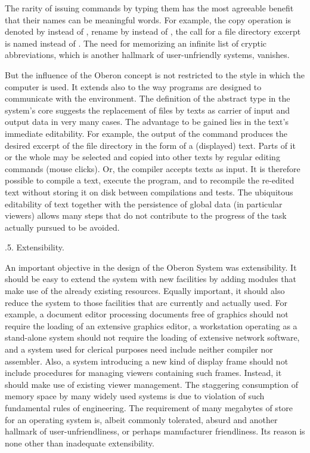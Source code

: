 The rarity of issuing commands by typing them has the most agreeable
benefit that their names can be meaningful words. For example, the
copy operation is denoted by  instead of , rename by 
instead of , the call for a file directory excerpt is named
 instead of . The need for memorizing an infinite list of
cryptic abbreviations, which is another hallmark of user-unfriendly
systems, vanishes.

But the influence of the Oberon concept is not restricted to the style
in which the computer is used. It extends also to the way programs are
designed to communicate with the environment. The definition of the
abstract type  in the system's core suggests the replacement
of files by texts as carrier of input and output data in very many
cases. The advantage to be gained lies in the text's immediate
editability. For example, the output of the command 
produces the desired excerpt of the file directory
in the form of a (displayed) text. Parts of it or the whole may be
selected and copied into other texts by regular editing commands
(mouse clicks). Or, the compiler accepts texts as input. It is
therefore possible to compile a text, execute the program, and to
recompile the re-edited text without storing it on disk between
compilations and tests. The ubiquitous editability of text together
with the persistence of global data (in particular viewers) allows
many steps that do not contribute to the progress of the task actually
pursued to be avoided.

.5. Extensibility.

An important objective in the design of the Oberon System was
extensibility. It should be easy to extend the system with new
facilities by adding modules that make use of the already existing
resources. Equally important, it should also reduce the system to
those facilities that are currently and actually used. For example, a
document editor processing documents free of graphics should not
require the loading of an extensive graphics editor, a workstation
operating as a stand-alone system should not require the loading of
extensive network software, and a system used for clerical purposes
need include neither compiler nor assembler. Also, a system
introducing a new kind of display frame should not include procedures
for managing viewers containing such frames. Instead, it should make
use of existing viewer management. The staggering consumption of
memory space by many widely used systems is due to violation of such
fundamental rules of engineering. The requirement of many megabytes of
store for an operating system is, albeit commonly tolerated, absurd
and another hallmark of user-unfriendliness, or perhaps manufacturer
friendliness. Its reason is none other than inadequate extensibility.

